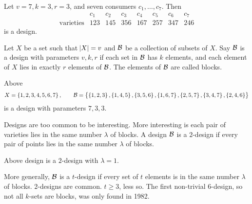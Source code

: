 \begin{example*}
Let $ v = 7, k = 3, r = 3 $, and seven consumers $ c_1, \dots, c_7 $. Then
$$
\begin{array}{c|ccccccc}
& c_1 & c_2 & c_3 & c_4 & c_5 & c_6 & c_7 \\
\hline
\text{varieties} & 123 & 145 & 356 & 167 & 257 & 347 & 246
\end{array}
$$
is a design.
\end{example*}

Let $ X $ be a set such that $ \abs{X} = v $ and $ \mathcal{B} $ be a collection of subsets of $ X $. Say $ \mathcal{B} $ is a design with parameters $ v, k, r $ if each set in $ \mathcal{B} $ has $ k $ elements, and each element of $ X $ lies in exactly $ r $ elements of $ \mathcal{B} $. The elements of $ \mathcal{B} $ are called blocks.

\begin{example*}
Above
$$ X = \cbr{1, 2, 3, 4, 5, 6, 7}, \qquad \BB = \cbr{\cbr{1, 2, 3}, \cbr{1, 4, 5}, \cbr{3, 5, 6}, \cbr{1, 6, 7}, \cbr{2, 5, 7}, \cbr{3, 4, 7}, \cbr{2, 4, 6}} $$
is a design with parameters $ 7, 3, 3 $.
\end{example*}

Designs are too common to be interesting. More interesting is each pair of varieties lies in the same number $ \lambda $ of blocks. A design $ \mathcal{B} $ is a $ 2 $-design if every pair of points lies in the same number $ \lambda $ of blocks.

\begin{example*}
Above design is a $ 2 $-design with $ \lambda = 1 $.
\end{example*}

More generally, $ \mathcal{B} $ is a $ t $-design if every set of $ t $ elements is in the same number $ \lambda $ of blocks. $ 2 $-designs are common. $ t \ge 3 $, less so. The first non-trivial $ 6 $-design, so not all $ k $-sets are blocks, was only found in 1982.


